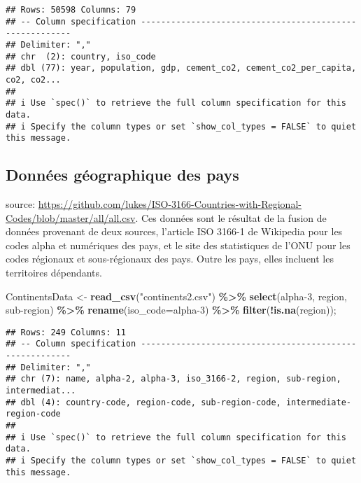 \documentclass[
]{article}
\newenvironment{Shaded}{\begin{snugshade}}{\end{snugshade}}
\newcommand{\AttributeTok}[1]{\textcolor[rgb]{0.13,0.29,0.53}{#1}}
\newcommand{\FunctionTok}[1]{\textcolor[rgb]{0.13,0.29,0.53}{\textbf{#1}}}
\newcommand{\NormalTok}[1]{#1}
\newcommand{\OtherTok}[1]{\textcolor[rgb]{0.56,0.35,0.01}{#1}}
\newcommand{\SpecialCharTok}[1]{\textcolor[rgb]{0.81,0.36,0.00}{\textbf{#1}}}
\newcommand{\StringTok}[1]{\textcolor[rgb]{0.31,0.60,0.02}{#1}}
\begin{document}
\begin{verbatim}
## Rows: 50598 Columns: 79
## -- Column specification --------------------------------------------------------
## Delimiter: ","
## chr  (2): country, iso_code
## dbl (77): year, population, gdp, cement_co2, cement_co2_per_capita, co2, co2...
## 
## i Use `spec()` to retrieve the full column specification for this data.
## i Specify the column types or set `show_col_types = FALSE` to quiet this message.
\end{verbatim}

\hypertarget{donnuxe9es-guxe9ographique-des-pays}{%
\subsection{Données géographique des
pays}\label{donnuxe9es-guxe9ographique-des-pays}}

source:
\url{https://github.com/lukes/ISO-3166-Countries-with-Regional-Codes/blob/master/all/all.csv}.
Ces données sont le résultat de la fusion de données provenant de deux
sources, l'article ISO 3166-1 de Wikipedia pour les codes alpha et
numériques des pays, et le site des statistiques de l'ONU pour les codes
régionaux et sous-régionaux des pays. Outre les pays, elles incluent les
territoires dépendants.

\begin{Shaded}
\begin{Highlighting}[]
\NormalTok{ContinentsData }\OtherTok{\textless{}{-}} \FunctionTok{read\_csv}\NormalTok{(}\StringTok{"continents2.csv"}\NormalTok{) }\SpecialCharTok{\%\textgreater{}\%}
  \FunctionTok{select}\NormalTok{(}\StringTok{\textquotesingle{}alpha{-}3\textquotesingle{}}\NormalTok{, region, }\StringTok{\textquotesingle{}sub{-}region\textquotesingle{}}\NormalTok{) }\SpecialCharTok{\%\textgreater{}\%}
  \FunctionTok{rename}\NormalTok{(}\AttributeTok{iso\_code=}\StringTok{\textquotesingle{}alpha{-}3\textquotesingle{}}\NormalTok{) }\SpecialCharTok{\%\textgreater{}\%}
  \FunctionTok{filter}\NormalTok{(}\SpecialCharTok{!}\FunctionTok{is.na}\NormalTok{(region));}
\end{Highlighting}
\end{Shaded}

\begin{verbatim}
## Rows: 249 Columns: 11
## -- Column specification --------------------------------------------------------
## Delimiter: ","
## chr (7): name, alpha-2, alpha-3, iso_3166-2, region, sub-region, intermediat...
## dbl (4): country-code, region-code, sub-region-code, intermediate-region-code
## 
## i Use `spec()` to retrieve the full column specification for this data.
## i Specify the column types or set `show_col_types = FALSE` to quiet this message.
\end{verbatim}
\end{document}
